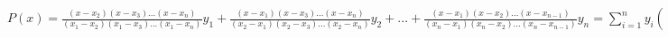 {\normalsize
    
    $P(x) = \frac{(x-x_2)(x-x_3)...(x-x_n)}{(x_1-x_2)(x_1-x_3)...(x_1-x_n)}y_1 + 
    \frac{(x-x_1)(x-x_3)...(x-x_n)}{(x_2-x_1)(x_2-x_3)...(x_2-x_n)}y_2 + ... +
    \frac{(x-x_1)(x-x_2)...(x-x_{n-1})}{(x_n-x_1)(x_n-x_2)...(x_n-x_{n-1})}y_n
    =
    \displaystyle \sum_{i=1}^{n} y_i (\prod_{j=1, i\neq j}^{n} \frac{x-x_j}{x_i-x_j} )$
}
